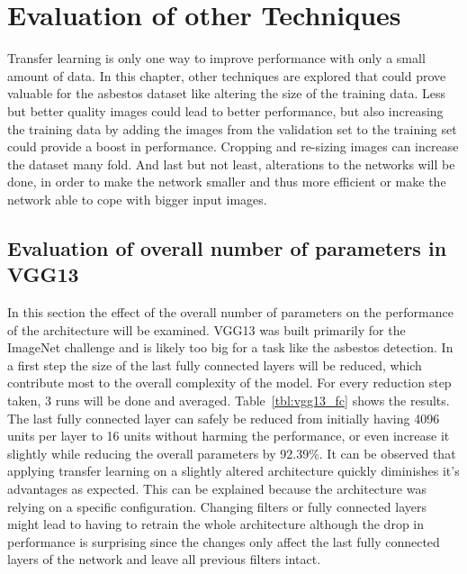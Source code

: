 \chapter{Evaluation of other Techniques}

Transfer learning is only one way to improve performance with only a small amount of data. In this chapter, other techniques are explored that could prove valuable for the asbestos dataset like altering the size of the training data. Less but better quality images could lead to better performance, but also increasing the training data by adding the images from the validation set to the training set could provide a boost in performance. Cropping and re-sizing images can increase the dataset many fold. And last but not least, alterations to the networks will be done, in order to make the network smaller and thus more efficient or make the network able to cope with bigger input images.

\section{Evaluation of overall number of parameters in VGG13}

In this section the effect of the overall number of parameters on the performance of the architecture will be examined.
VGG13 was built primarily for the ImageNet challenge and is likely too big for a task like the asbestos detection. In a first step the size of the last fully connected layers will be reduced, which contribute most to the overall complexity of the  model. For every reduction step taken, 3 runs will be done and  averaged. Table~\ref{tbl:vgg13_fc} shows the results. The last fully connected layer can safely be reduced from initially having 4096 units per layer to 16 units without harming the performance, or even increase it slightly while reducing the overall parameters by 92.39\%. It can be observed that applying transfer learning on a slightly altered architecture quickly diminishes it's advantages as expected. This can be explained because the architecture was relying on a specific configuration. Changing filters or fully connected layers might lead to having to retrain the whole architecture although the drop in performance is surprising since the changes only affect the last fully connected layers of the network and leave all previous filters intact.


